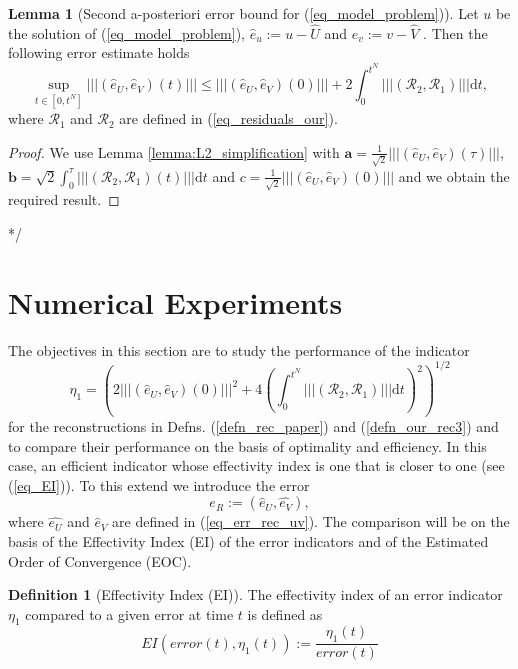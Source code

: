 \documentclass[12pt,a4paper]{article}
\numberwithin{equation}{section}
\theoremstyle{definition}
\newcommand{\pnorm}[1]{\left|\left|\left|#1\right|\right|\right|}
\newcommand{\vect}[1]{\textbf{#1}}
\newcommand{\qp}[1]{\left(#1\right)}
\newcommand{\qb}[1]{\left[#1\right]}
\newcommand{\rec}[1]{\widehat{{#1}}}
\newtheorem{Defn}[subsection]{Definition}
\newtheorem{Lemma}[subsection]{Lemma}
\begin{document}
\begin{Lemma}[Second a-posteriori error bound for (\ref{eq_model_problem})]
	Let $u$ be the solution of (\ref{eq_model_problem}), $\hat{e}_u:=u-\rec{U}$ and $\hat{e}_v:=v-\rec{V}$ .  Then the following error estimate holds
	\begin{equation}\label{eq_bound_2}
	\sup_{t\in\qb{0,t^N}}\pnorm{\qp{\hat{e}_U,\hat{e}_V}\qp{t}}\leq
	\pnorm{\qp{\hat{e}_U,\hat{e}_V}\qp{0}}+
	2{\int_0^{t^N}\pnorm{\qp{\mathcal{R}_2,\mathcal{R}_1}}\mathrm{d}t},
	\end{equation}
	where $\mathcal{R}_1$ and $\mathcal{R}_2$ are defined in (\ref{eq_residuals_our}).
\end{Lemma}
\begin{proof}
We use  Lemma  \ref{lemma:L2_simplification} with $\vect{a}=\frac{1}{\sqrt{2}}\pnorm{\qp{\hat{e}_U, \hat{e}_V}\qp{\tau}}$, $\vect{b}=\sqrt{2}\int_0^\tau\pnorm{\qp{\mathcal{R}_2,\mathcal{R}_1}\qp{t}} \mathrm{d}t$ and $c = \frac{1}{\sqrt{2}}\pnorm{\qp{\hat{e}_U, \hat{e}_V}\qp{0}}$ and we obtain the required result.
\end{proof}

*/

\section{Numerical Experiments}\label{sec_num_exp}
The objectives in this section are to study the performance of the indicator 
\begin{equation}\label{eq_bound_test}
\eta_1=\qp{2\pnorm{\qp{\hat{e}_U,\hat{e}_V}\qp{0}}^2+
	4\qp{\int_0^{t^N}\pnorm{\qp{\mathcal{R}_2,\mathcal{R}_1}}\mathrm{d}t}^2}^{1/2}
\end{equation}
for the reconstructions in Defns. (\ref{defn_rec_paper}) and (\ref{defn_our_rec3})  and to compare their performance on the basis of optimality and efficiency.  In this case, an efficient indicator whose effectivity index is one that is closer to one (see (\ref{eq_EI})). To this extend we introduce the error
\begin{equation}\label{eq_error_eR}
e_R :=\qp{\hat{e}_U,\hat{e_V}},
\end{equation}
where $\hat{e_U}$ and $\hat{e}_V$ are defined in (\ref{eq_err_rec_uv}).  
The comparison will be on the basis of the Effectivity Index (EI) of the error indicators and of the Estimated Order of Convergence (EOC).
\begin{Defn}[Effectivity Index (EI)] The effectivity index of an error indicator $\eta_1$ compared to a given error at time $t$ is defined as
\begin{equation}\label{eq_EI}
EI\qp{error\qp{t}, \eta_1\qp{t}} := \frac{\eta_1\qp{t}}{error\qp{t}}
\end{equation}
\end{Defn}
\end{document}
